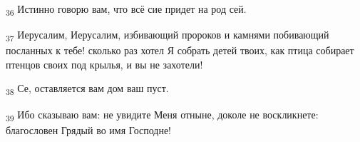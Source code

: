 \begin{tcolorbox}
\textsubscript{36} Истинно говорю вам, что всё сие придет на род сей.
\end{tcolorbox}
\begin{tcolorbox}
\textsubscript{37} Иерусалим, Иерусалим, избивающий пророков и камнями побивающий посланных к тебе! сколько раз хотел Я собрать детей твоих, как птица собирает птенцов своих под крылья, и вы не захотели!
\end{tcolorbox}
\begin{tcolorbox}
\textsubscript{38} Се, оставляется вам дом ваш пуст.
\end{tcolorbox}
\begin{tcolorbox}
\textsubscript{39} Ибо сказываю вам: не увидите Меня отныне, доколе не воскликнете: благословен Грядый во имя Господне!
\end{tcolorbox}
